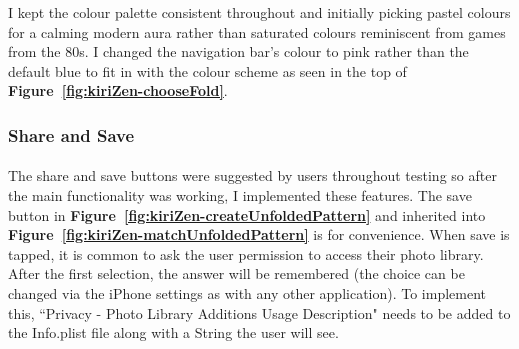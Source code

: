 \documentclass[11pt]{article}
\begin{document}
            I kept the colour palette consistent throughout and initially picking pastel colours for a calming modern  aura rather than saturated colours reminiscent from games from the 80s. I changed the navigation bar's colour to pink rather than the default blue to fit in with the colour scheme as seen in the top of \textbf{Figure~\ref{fig:kiriZen-chooseFold}}.
            
            
             \subsubsection{Share and Save}
                \paragraph{}
                
                The share and save buttons were suggested by users throughout testing so after the main functionality was working, I implemented these features. The save button in \textbf{Figure~\ref{fig:kiriZen-createUnfoldedPattern}} and inherited into \textbf{Figure~\ref{fig:kiriZen-matchUnfoldedPattern}} is for convenience. When save is tapped, it is common to ask the user permission to access their photo library. After the first selection, the answer will be remembered (the choice can be changed via the iPhone settings as with any other application). To implement this,                 ``Privacy - Photo Library Additions Usage Description" needs to be added to the Info.plist file along with a String the user will see. %
                
\end{document}
